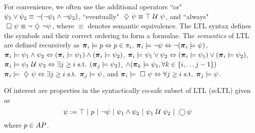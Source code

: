 \documentclass{ifacconf}
\begin{document}
    For convenience, we often use the additional operators 
    ``or"  $\psi_1 \vee \psi_2 \equiv  \neg (\neg \psi_1 \wedge \neg \psi_2)$, ``eventually"
    $\ \diamondsuit\  \psi \equiv \top \ \mathcal{U}\  \psi$, and
   ``always"  $\ \square\  \psi \equiv \neg \ \diamondsuit\  \neg \psi$,
    where $\equiv$ denotes semantic equivalence. The LTL syntax defines the symbols and their correct ordering to form a formulae. %
%    
     The {\em semantics} of LTL  are defined recursively as
${\boldsymbol{\pi}}_i \models p   \Leftrightarrow p\in\pi_i$, 
    ${\boldsymbol{\pi}}_i \models \neg \psi  \Leftrightarrow\neg ({\boldsymbol{\pi}}_i \models \psi) $, 
    ${\boldsymbol{\pi}}_i \models \psi_1 \wedge  \psi_2   \Leftrightarrow  ( {\boldsymbol{\pi}}_i \models \psi_1 ) \wedge ( {\boldsymbol{\pi}}_i \models \psi_2 ) $, 
    ${\boldsymbol{\pi}}_i \models \psi_1 \vee  \psi_2   \Leftrightarrow  ( {\boldsymbol{\pi}}_i \models \psi_1 ) \vee ( {\boldsymbol{\pi}}_i \models \psi_2 ) $, 
    ${\boldsymbol{\pi}}_i \models  \psi_1 \ \mathcal{U}\  \psi_2  \Leftrightarrow \exists j \geq i \text{ s.t. } ({\boldsymbol{\pi}}_j \models \psi_2 ) $, 
    $  \wedge ({\boldsymbol{\pi}}_k \models \psi_1, \forall k \in \{i, \ldots j-1\})$
    ${\boldsymbol{\pi}}_i \models \ \diamondsuit\  \psi   \Leftrightarrow \exists j \geq i \text{ s.t. }{\boldsymbol{\pi}}_j \models \psi $, and 
    ${\boldsymbol{\pi}}_i \models \ \square\  \psi   \Leftrightarrow  \forall j \geq i \text{ s.t. }{\boldsymbol{\pi}}_j \models \psi$.



Of interest are properties in the syntactically co-safe subset of LTL (scLTL) given as
    \begin{equation}\label{eq:scLTL}
     \psi :=  \top \ |\ p \ |\ \neg \psi \ |\ \psi_1 \wedge \psi_2 \ |\ \psi_1 \ \mathcal{U}\  \psi_2 \ |\ \bigcirc \psi
    \end{equation}     where $p\in AP$.
     
\end{document}
